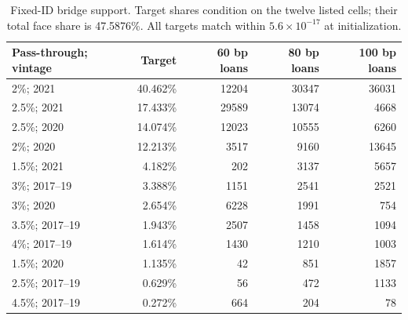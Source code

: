 \begin{table}[H]
\centering\small
\caption{Fixed-ID bridge support. Target shares condition on the twelve listed cells; their total face share is 47.5876\%. All targets match within $5.6\times10^{-17}$ at initialization.}
\label{tab:support}
\begin{tabular}{@{}lrrrr@{}}\toprule
Pass-through; vintage & Target & 60 bp loans & 80 bp loans & 100 bp loans\\\midrule
2\%; 2021 & 40.462\% & 12204 & 30347 & 36031\\
2.5\%; 2021 & 17.433\% & 29589 & 13074 & 4668\\
2.5\%; 2020 & 14.074\% & 12023 & 10555 & 6260\\
2\%; 2020 & 12.213\% & 3517 & 9160 & 13645\\
1.5\%; 2021 & 4.182\% & 202 & 3137 & 5657\\
3\%; 2017--19 & 3.388\% & 1151 & 2541 & 2521\\
3\%; 2020 & 2.654\% & 6228 & 1991 & 754\\
3.5\%; 2017--19 & 1.943\% & 2507 & 1458 & 1094\\
4\%; 2017--19 & 1.614\% & 1430 & 1210 & 1003\\
1.5\%; 2020 & 1.135\% & 42 & 851 & 1857\\
2.5\%; 2017--19 & 0.629\% & 56 & 472 & 1133\\
4.5\%; 2017--19 & 0.272\% & 664 & 204 & 78\\
\bottomrule
\end{tabular}
\end{table}
